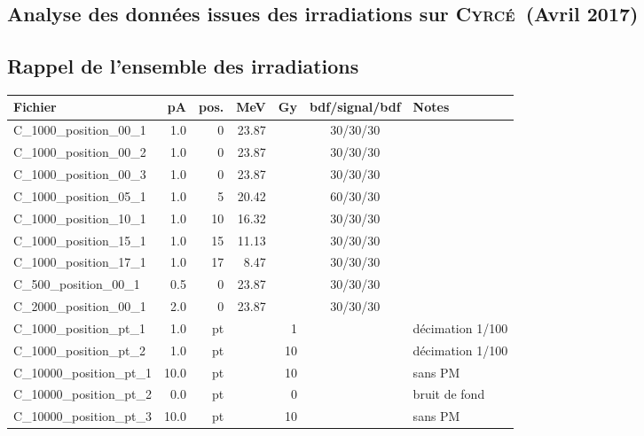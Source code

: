\documentclass[a4paper,11pt]{article}
\newcommand{\cyrce}{\textsc{Cyrcé}}
\begin{document}
\setmarginsrb{3.5cm}{1.5cm}{1.5cm}{2cm}{2ex}{3ex}{2ex}{5ex}
%
\lhead[]{}
\fancyfoot[C]{}
\fancyfoot[R]{\thepage}

\begin{center}
\subsection*{Analyse des données issues des irradiations sur \cyrce\ (Avril 2017)}
\end{center}

\subsection*{Rappel de l'ensemble des irradiations}
\begin{center}
\begin{tabular}{lrrrrcl}
Fichier&pA&pos.&MeV&Gy&bdf/signal/bdf&Notes\\
\hline
\hline
C\_1000\_position\_00\_1&1.0&0&23.87&&30/30/30&\\
C\_1000\_position\_00\_2&1.0&0&23.87&&30/30/30&\\
C\_1000\_position\_00\_3&1.0&0&23.87&&30/30/30&\\
C\_1000\_position\_05\_1&1.0&5&20.42&&60/30/30&\\
C\_1000\_position\_10\_1&1.0&10&16.32&&30/30/30&\\
C\_1000\_position\_15\_1&1.0&15&11.13&&30/30/30&\\
C\_1000\_position\_17\_1&1.0&17&8.47&&30/30/30&\\
C\_500\_position\_00\_1&0.5&0&23.87&&30/30/30&\\
C\_2000\_position\_00\_1&2.0&0&23.87&&30/30/30&\\
C\_1000\_position\_pt\_1&1.0&pt&&1&&décimation 1/100\\
C\_1000\_position\_pt\_2&1.0&pt&&10&&décimation 1/100\\
C\_10000\_position\_pt\_1&10.0&pt&&10&&sans PM\\
C\_10000\_position\_pt\_2&0.0&pt&&0&&bruit de fond\\
C\_10000\_position\_pt\_3&10.0&pt&&10&&sans PM\\
\hline
\end{tabular}
\end{center}
\end{document}
